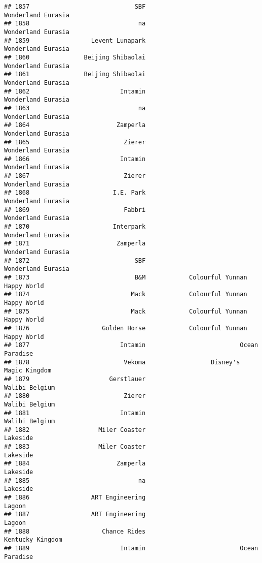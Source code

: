 \documentclass[
]{article}
\begin{document}
\begin{verbatim}
## 1857                             SBF                      Wonderland Eurasia
## 1858                              na                      Wonderland Eurasia
## 1859                 Levent Lunapark                      Wonderland Eurasia
## 1860               Beijing Shibaolai                      Wonderland Eurasia
## 1861               Beijing Shibaolai                      Wonderland Eurasia
## 1862                         Intamin                      Wonderland Eurasia
## 1863                              na                      Wonderland Eurasia
## 1864                        Zamperla                      Wonderland Eurasia
## 1865                          Zierer                      Wonderland Eurasia
## 1866                         Intamin                      Wonderland Eurasia
## 1867                          Zierer                      Wonderland Eurasia
## 1868                       I.E. Park                      Wonderland Eurasia
## 1869                          Fabbri                      Wonderland Eurasia
## 1870                       Interpark                      Wonderland Eurasia
## 1871                        Zamperla                      Wonderland Eurasia
## 1872                             SBF                      Wonderland Eurasia
## 1873                             B&M            Colourful Yunnan Happy World
## 1874                            Mack            Colourful Yunnan Happy World
## 1875                            Mack            Colourful Yunnan Happy World
## 1876                    Golden Horse            Colourful Yunnan Happy World
## 1877                         Intamin                          Ocean Paradise
## 1878                          Vekoma                  Disney's Magic Kingdom
## 1879                      Gerstlauer                          Walibi Belgium
## 1880                          Zierer                          Walibi Belgium
## 1881                         Intamin                          Walibi Belgium
## 1882                   Miler Coaster                                Lakeside
## 1883                   Miler Coaster                                Lakeside
## 1884                        Zamperla                                Lakeside
## 1885                              na                                Lakeside
## 1886                 ART Engineering                                  Lagoon
## 1887                 ART Engineering                                  Lagoon
## 1888                    Chance Rides                        Kentucky Kingdom
## 1889                         Intamin                          Ocean Paradise

\end{verbatim}
\end{document}

